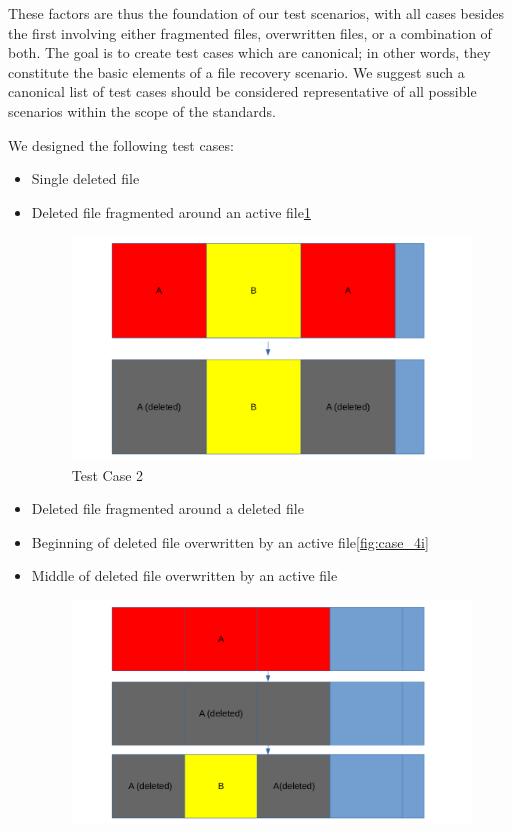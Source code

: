 These factors are thus the foundation of our test scenarios, with all cases besides the first involving either fragmented files, overwritten files, or a combination of both. 
The goal is to create test cases which are canonical; in other words, they constitute the basic elements of a file recovery scenario.
We suggest such a canonical list of test cases should be considered representative of all possible scenarios within the scope of the standards.

We designed the following test cases:
\begin{itemize}
    \item [1] Single deleted file
    \item [2] Deleted file fragmented around an active file\ref{fig:case_2}
    \begin{figure}[h]
        \centering
        \includegraphics[width=\linewidth]{fig/case2.png}
        \caption{Test Case 2}
        \label{fig:case_2}
    \end{figure}
    \item [3] Deleted file fragmented around a deleted file
    \item [4i] Beginning of deleted file overwritten by an active file\ref{fig:case_4i}
    \item [4ii] Middle of deleted file overwritten by an active file
        \begin{figure}[h]
        \centering
        \includegraphics[width=\linewidth]{fig/case4ii.png}

\end{figure}
\end{itemize}
